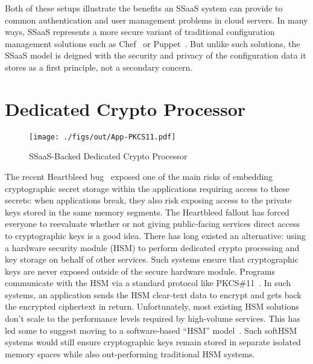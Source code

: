 Both of these setups illustrate the benefits an SSaaS system can
provide to common authentication and user management problems in cloud
servers. In many ways, SSaaS represents a more secure variant of
traditional configuration management solutions such as
Chef~\cite{chef} or Puppet~\cite{puppet}. But unlike such solutions,
the SSaaS model is deigned with the security and privacy of the
configuration data it stores as a first principle, not a secondary
concern.

\section{Dedicated Crypto Processor}

\begin{figure}[t]
  \centering
  \texttt{[image: ./figs/out/App-PKCS11.pdf]}
  \caption{SSaaS-Backed Dedicated Crypto Processor}
  \label{fig:app-pkcs11}
\end{figure}

The recent Heartbleed bug~\cite{heartbleed} exposed one of the main
risks of embedding cryptographic secret storage within the
applications requiring access to these secrets: when applications
break, they also risk exposing access to the private keys stored in
the same memory segments. The Heartbleed fallout has forced everyone
to reevaluate whether or not giving public-facing services direct
access to cryptographic keys is a good idea. There has long existed an
alternative: using a hardware security module (HSM) to perform
dedicated crypto processing and key storage on behalf of other
services. Such systems ensure that cryptographic keys are never
exposed outside of the secure hardware module. Programs communicate
with the HSM via a standard protocol like
PKCS\#11~\cite{pcks11-standard}. In such systems, an application sends
the HSM clear-text data to encrypt and gets back the encrypted
ciphertext in return. Unfortunately, most existing HSM solutions don't
scale to the performance levels required by high-volume services. This
has led some to suggest moving to a software-based ``HSM''
model~\cite{lorier-pkcs11}. Such softHSM systems would still ensure
cryptographic keys remain stored in separate isolated memory spaces
while also out-performing traditional HSM systems.

